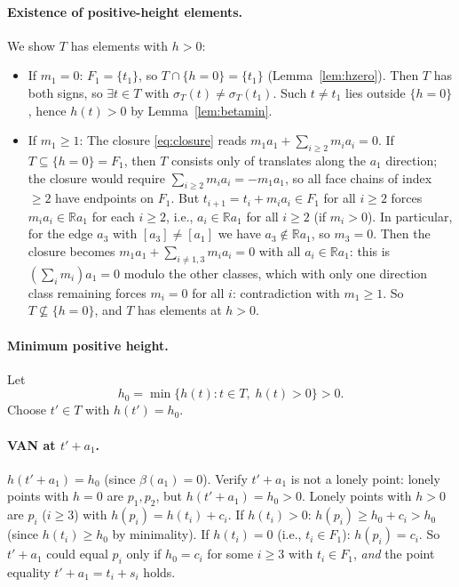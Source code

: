 \paragraph{Existence of positive-height elements.}
We show $T$ has elements with $h>0$:
\begin{itemize}
\item If $m_1=0$: $F_1=\{t_1\}$, so $T\cap\{h=0\}=\{t_1\}$ (Lemma~\ref{lem:hzero}).
  Then $T$ has both signs, so $\exists t\in T$ with $\sigma_T(t)\ne\sigma_T(t_1)$.
  Such $t\ne t_1$ lies outside $\{h=0\}$, hence $h(t)>0$ by Lemma~\ref{lem:betamin}.
\item If $m_1\ge 1$: The closure \eqref{eq:closure} reads $m_1 a_1+\sum_{i\ge2}m_i a_i=0$.
  If $T\subseteq\{h=0\}=F_1$, then $T$ consists only of translates along the $a_1$
  direction; the closure would require $\sum_{i\ge2}m_i a_i=-m_1 a_1$,
  so all face chains of index $\ge 2$ have endpoints on $F_1$.
  But $t_{i+1}=t_i+m_i a_i\in F_1$ for all $i\ge 2$ forces $m_i a_i\in\mathbb{R}a_1$
  for each $i\ge 2$, i.e., $a_i\in\mathbb{R}a_1$ for all $i\ge 2$ (if $m_i>0$).
  In particular, for the edge $a_3$ with $[a_3]\ne[a_1]$ we have $a_3\notin\mathbb{R}a_1$,
  so $m_3=0$.  Then the closure becomes
  $m_1 a_1+\sum_{i\ne1,3}m_i a_i=0$ with all $a_i\in\mathbb{R}a_1$:
  this is $(\sum_i m_i)a_1=0$ modulo the other classes,
  which with only one direction class remaining forces $m_i=0$ for all $i$:
  contradiction with $m_1\ge 1$.
  So $T\not\subseteq\{h=0\}$, and $T$ has elements at $h>0$.
\end{itemize}

\paragraph{Minimum positive height.}
Let
\[
  h_0 = \min\{h(t):t\in T,\;h(t)>0\} > 0.
\]
Choose $t'\in T$ with $h(t')=h_0$.

\paragraph{VAN at $t'+a_1$.}
$h(t'+a_1)=h_0$ (since $\beta(a_1)=0$).
Verify $t'+a_1$ is not a lonely point:
lonely points with $h=0$ are $p_1,p_2$, but $h(t'+a_1)=h_0>0$.
Lonely points with $h>0$ are $p_i$ ($i\ge 3$) with $h(p_i)=h(t_i)+c_i$.
If $h(t_i)>0$: $h(p_i)\ge h_0+c_i>h_0$ (since $h(t_i)\ge h_0$ by minimality).
If $h(t_i)=0$ (i.e., $t_i\in F_1$): $h(p_i)=c_i$.
So $t'+a_1$ could equal $p_i$ only if $h_0=c_i$ for some $i\ge 3$ with $t_i\in F_1$,
\emph{and} the point equality $t'+a_1=t_i+s_i$ holds.

